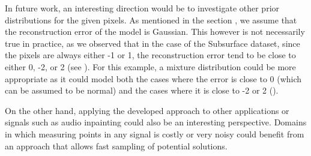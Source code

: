 In future work, an interesting direction would be to investigate other prior distributions for the given pixels. As mentioned in the section , we assume that the reconstruction error of the model is Gaussian. This however is not necessarily true in practice, as we observed that in the case of the Subsurface dataset, since the pixels are always either -1 or 1, the reconstruction error tend to be close to either 0, -2, or 2 (see ). For this example, a mixture distribution could be more appropriate as it could model both the cases where the error is close to 0 (which can be assumed to be normal) and the cases where it is close to -2 or 2 (). 

On the other hand, applying the developed approach to other applications or signals such as audio inpainting \citep{Marafioti2018} could also be an interesting perspective. Domains in which measuring points in any signal is costly or very noisy could benefit from an approach that allows fast sampling of potential solutions.
